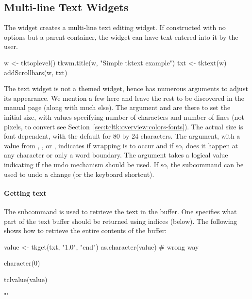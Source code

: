 \subsection{Multi-line Text Widgets}
\label{sec:tcltk:multi-line-text}

The  widget creates a multi-line text editing
widget. If constructed with no options but a parent container, the
widget can have text entered into it by the user.

\begin{Schunk}
\begin{Sinput}
 w <- tktoplevel()
 tkwm.title(w, "Simple tktext example")
 txt <- tktext(w)
 addScrollbars(w, txt)
\end{Sinput}
\end{Schunk}
%

The text widget is not a themed widget, hence has numerous arguments
to adjust its appearance. We mention a few here and leave the rest to
be discovered in the manual page (along with much else). The argument
 and  are there to
set the initial size, with values specifying number of characters and
number of lines (not pixels, to convert see
Section~\ref{sec:tcltk:overview:colors-fonts}). The actual size is
font dependent, with the default for 80 by 24 characters. The
 argument, with a value from ,
, or , indicates if wrapping is to occur and
if so, does it happen at any character or only a word boundary. The
argument  takes a logical value indicating if
the undo mechanism should be used. If so, the subcommand
 can be used to undo a change (or the
 keyboard shortcut).


\paragraph{Getting text}
The  subcommand is used to retrieve the text
in the buffer. One specifies what part of the text buffer should be
returned using indices (below). The following shows how to retrieve
the entire contents of the buffer:

\begin{Schunk}
\begin{Sinput}
 value <- tkget(txt, "1.0", "end")
 as.character(value)                     # wrong way
\end{Sinput}
\begin{Soutput}
character(0)
\end{Soutput}
\begin{Sinput}
 tclvalue(value)
\end{Sinput}
\begin{Soutput}
[1] "\n"
\end{Soutput}
\end{Schunk}

